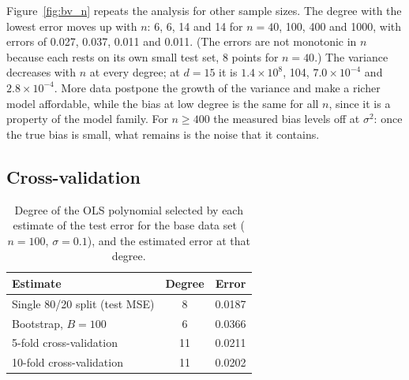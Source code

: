 \documentclass[aps,reprint,amsmath,amssymb,nofootinbib,floatfix]{revtex4-2}
\begin{document}
Figure~\ref{fig:bv_n} repeats the analysis for other sample sizes. The degree with the lowest
error moves up with $n$: 6, 6, 14 and 14 for $n=40$, 100, 400 and 1000, with errors of 0.027,
0.037, 0.011 and 0.011. (The errors are not monotonic in $n$ because each rests on its own small
test set, 8 points for $n=40$.) The variance decreases with $n$ at every degree; at $d=15$ it is
$1.4\times10^{8}$, 104, $7.0\times10^{-4}$ and $2.8\times10^{-4}$. More data postpone the growth
of the variance and make a richer model affordable, while the bias at low degree is the same for
all $n$, since it is a property of the model family. For $n\ge400$ the measured bias levels off at
$\sigma^2$: once the true bias is small, what remains is the noise that it contains.

\subsection{Cross-validation}\label{sec:res_cv}

\begin{table}[t]
\caption{Degree of the OLS polynomial selected by each estimate of the test error for the base
data set ($n=100$, $\sigma=0.1$), and the estimated error at that degree.}
\label{tab:selection}
\begin{ruledtabular}
\begin{tabular}{lcc}
Estimate & Degree & Error \\
\hline
Single 80/20 split (test MSE) & 8 & 0.0187 \\
Bootstrap, $B=100$ & 6 & 0.0366 \\
5-fold cross-validation & 11 & 0.0211 \\
10-fold cross-validation & 11 & 0.0202 \\
\end{tabular}
\end{ruledtabular}
\end{table}
\end{document}
